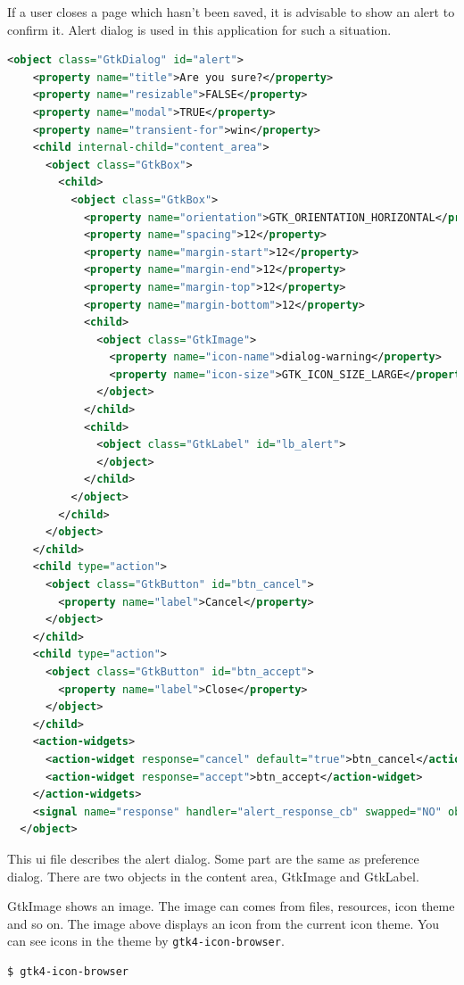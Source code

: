 If a user closes a page which hasn't been saved, it is advisable to show
an alert to confirm it. Alert dialog is used in this application for
such a situation.

\begin{lstlisting}[language=XML]
  <object class="GtkDialog" id="alert">
    <property name="title">Are you sure?</property>
    <property name="resizable">FALSE</property>
    <property name="modal">TRUE</property>
    <property name="transient-for">win</property>
    <child internal-child="content_area">
      <object class="GtkBox">
        <child>
          <object class="GtkBox">
            <property name="orientation">GTK_ORIENTATION_HORIZONTAL</property>
            <property name="spacing">12</property>
            <property name="margin-start">12</property>
            <property name="margin-end">12</property>
            <property name="margin-top">12</property>
            <property name="margin-bottom">12</property>
            <child>
              <object class="GtkImage">
                <property name="icon-name">dialog-warning</property>
                <property name="icon-size">GTK_ICON_SIZE_LARGE</property>
              </object>
            </child>
            <child>
              <object class="GtkLabel" id="lb_alert">
              </object>
            </child>
          </object>
        </child>
      </object>
    </child>
    <child type="action">
      <object class="GtkButton" id="btn_cancel">
        <property name="label">Cancel</property>
      </object>
    </child>
    <child type="action">
      <object class="GtkButton" id="btn_accept">
        <property name="label">Close</property>
      </object>
    </child>
    <action-widgets>
      <action-widget response="cancel" default="true">btn_cancel</action-widget>
      <action-widget response="accept">btn_accept</action-widget>
    </action-widgets>
    <signal name="response" handler="alert_response_cb" swapped="NO" object="nb"></signal>
  </object>
\end{lstlisting}

This ui file describes the alert dialog. Some part are the same as
preference dialog. There are two objects in the content area, GtkImage
and GtkLabel.

GtkImage shows an image. The image can comes from files, resources, icon
theme and so on. The image above displays an icon from the current icon
theme. You can see icons in the theme by
\passthrough{\lstinline!gtk4-icon-browser!}.

\begin{lstlisting}
$ gtk4-icon-browser
\end{lstlisting}

